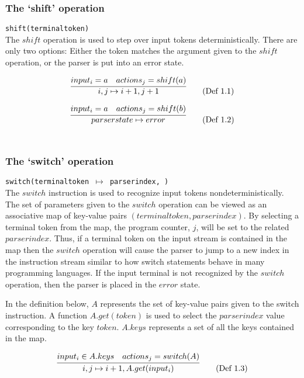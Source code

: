 \documentclass[envcountsame,runningheads]{llncs}
\begin{document}
\subsubsection{The `shift' operation}
\texttt{shift(terminaltoken)}\\
The $shi\!ft$ operation is used to step over input tokens deterministically. 
There are only two options: Either the token matches the argument given to the $shi\!ft$ operation, or the parser is put into an error state.

\begin{equation}
\infer{i, j \mapsto i+1, j+1}{input_i = a & actions_j = shift(a)} \tag{Def 1.1}
\end{equation}

\begin{equation}
\infer{parserstate \mapsto error}{input_i = a & actions_j = shift(b)} \tag{Def 1.2}
\end{equation}\\

\subsubsection{The `switch' operation}
\texttt{switch(terminaltoken $\mapsto$ parserindex, \textellipsis)}\\
The $switch$ instruction is used to recognize input tokens nondeterministically.
The set of parameters given to the $switch$ operation can be viewed as an associative map of key-value pairs $(terminaltoken, parserindex)$.
By selecting a terminal token from the map, the program counter, $j$, will be set to the related $parserindex$.
Thus, if a terminal token on the input stream is contained in the map then the $switch$ operation will cause the parser to jump to a new index in 
the instruction stream similar to how switch statements behave in many programming languages.
If the input terminal is not recognized by the $switch$ operation, then the parser is placed in the $error$ state.

In the definition below, $A$ represents the set of key-value pairs given to the switch instruction. 
A function $A.get(token)$ is used to select the $parserindex$ value corresponding to the key $token$.
$A.keys$ represents a set of all the keys contained in the map.

\begin{equation}
\infer{i, j \mapsto i+1, A.get(input_i)}{input_i \in A.keys & actions_j = switch(A)} \tag{Def 1.3}
\end{equation}
\end{document}
